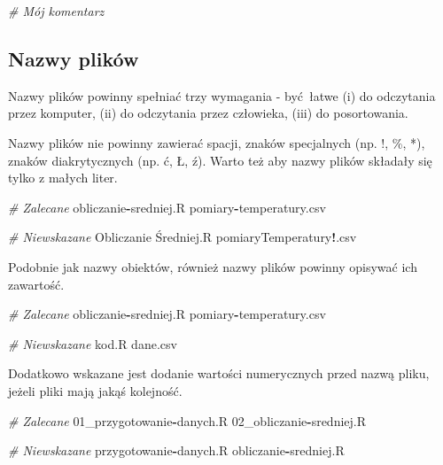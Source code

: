 \documentclass[paper=6in:9in,pagesize=pdftex,headinclude=on,footinclude=on,10pt]{scrbook}
\newenvironment{Shaded}{\begin{snugshade}}{\end{snugshade}}
\newcommand{\CommentTok}[1]{\textcolor[rgb]{0.56,0.35,0.01}{\textit{#1}}}
\newcommand{\DecValTok}[1]{\textcolor[rgb]{0.00,0.00,0.81}{#1}}
\newcommand{\NormalTok}[1]{#1}
\newcommand{\OperatorTok}[1]{\textcolor[rgb]{0.81,0.36,0.00}{\textbf{#1}}}
\begin{document}
\begin{Shaded}
\begin{Highlighting}[]
\CommentTok{# Mój komentarz}
\end{Highlighting}
\end{Shaded}

\hypertarget{nazwy-plikuxf3w}{%
\subsection{Nazwy plików}\label{nazwy-plikuxf3w}}

Nazwy plików powinny spełniać trzy wymagania - być~łatwe (i) do odczytania przez komputer, (ii) do odczytania przez człowieka, (iii) do posortowania.

Nazwy plików nie powinny zawierać spacji, znaków specjalnych (np. !, \%, *), znaków diakrytycznych (np. ć, Ł, ź).
Warto też aby nazwy plików składały się tylko z małych liter.

\begin{Shaded}
\begin{Highlighting}[]
\CommentTok{# Zalecane}
\NormalTok{obliczanie}\OperatorTok{-}\NormalTok{sredniej.R}
\NormalTok{pomiary}\OperatorTok{-}\NormalTok{temperatury.csv}

\CommentTok{# Niewskazane}
\NormalTok{Obliczanie Średniej.R}
\NormalTok{pomiaryTemperatury}\OperatorTok{!}\NormalTok{.csv}
\end{Highlighting}
\end{Shaded}

Podobnie jak nazwy obiektów, również nazwy plików powinny opisywać ich zawartość.

\begin{Shaded}
\begin{Highlighting}[]
\CommentTok{# Zalecane}
\NormalTok{obliczanie}\OperatorTok{-}\NormalTok{sredniej.R}
\NormalTok{pomiary}\OperatorTok{-}\NormalTok{temperatury.csv}

\CommentTok{# Niewskazane}
\NormalTok{kod.R}
\NormalTok{dane.csv}
\end{Highlighting}
\end{Shaded}

Dodatkowo wskazane jest dodanie wartości numerycznych przed nazwą pliku, jeżeli pliki mają jakąś kolejność.

\begin{Shaded}
\begin{Highlighting}[]
\CommentTok{# Zalecane}
\DecValTok{01}\NormalTok{_przygotowanie}\OperatorTok{-}\NormalTok{danych.R}
\DecValTok{02}\NormalTok{_obliczanie}\OperatorTok{-}\NormalTok{sredniej.R}

\CommentTok{# Niewskazane}
\NormalTok{przygotowanie}\OperatorTok{-}\NormalTok{danych.R}
\NormalTok{obliczanie}\OperatorTok{-}\NormalTok{sredniej.R}
\end{Highlighting}
\end{Shaded}
\end{document}
